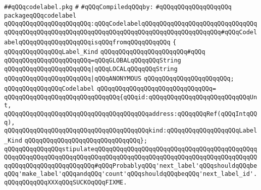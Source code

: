 \label{src/lib/compiler/back/low/code/codelabel.pkg}
\verb|##qQQqcodelabel.pkg|\newline
\verb|#|\newline
\newline
\verb|#qQQqCompiledqQQqby:|\newline
\verb|#qQQqqQQqqQQqqQQqqQQq|\newline
\newline
\newline
\newline
\verb|packageqQQqcodelabel|\newline
\verb|qQQqqQQqqQQqqQQqqQQqqQQq:qQQqCodelabelqQQqqQQqqQQqqQQqqQQqqQQqqQQqqQQqqQQqqQQqqQQqqQQqqQQqqQQqqQQqqQQqqQQqqQQqqQQqqQQqqQQqqQQqqQQq#qQQqCodelabelqQQqqQQqqQQqqQQqqQQqisqQQqfromqQQqqQQqqQQq|\newline
\verb|{|\newline
\verb|qQQqqQQqqQQqqQQqLabel_Kind|\newline
\verb|qQQqqQQqqQQqqQQqqQQqqQQq#qQQq|\newline
\verb|qQQqqQQqqQQqqQQqqQQqqQQq=qQQqGLOBALqQQqqQQqString|\newline
\verb|qQQqqQQqqQQqqQQqqQQqqQQq|\verb#|qQQqLOCALqQQqqQQqString#\newline
\verb|qQQqqQQqqQQqqQQqqQQqqQQq|\verb#|qQQqANONYMOUS#\newline
\verb|qQQqqQQqqQQqqQQqqQQqqQQq;|\newline
\newline
\verb|qQQqqQQqqQQqqQQqCodelabel|\newline
\verb|qQQqqQQqqQQqqQQqqQQqqQQqqQQqqQQq=|\newline
\verb|qQQqqQQqqQQqqQQqqQQqqQQqqQQqqQQq{qQQqid:qQQqqQQqqQQqqQQqqQQqqQQqqQQqUnt,|\newline
\verb|qQQqqQQqqQQqqQQqqQQqqQQqqQQqqQQqqQQqqQQqaddress:qQQqqQQqRef(qQQqIntqQQq),|\newline
\verb|qQQqqQQqqQQqqQQqqQQqqQQqqQQqqQQqqQQqqQQqkind:qQQqqQQqqQQqqQQqqQQqLabel_Kind|\newline
\verb|qQQqqQQqqQQqqQQqqQQqqQQqqQQqqQQq};|\newline
\newline
\verb|qQQqqQQqqQQqqQQqstipulateqQQqqQQqqQQqqQQqqQQqqQQqqQQqqQQqqQQqqQQqqQQqqQQqqQQqqQQqqQQqqQQqqQQqqQQqqQQqqQQqqQQqqQQqqQQqqQQqqQQqqQQqqQQqqQQqqQQqqQQqqQQqqQQqqQQqqQQqqQQq#qQQqProbablyqQQq'next_label'qQQqshouldqQQqbeqQQq'make_label'qQQqandqQQq'count'qQQqshouldqQQqbeqQQq'next_label_id'.qQQqqQQqqQQqXXXqQQqSUCKOqQQqFIXME.|\newline
